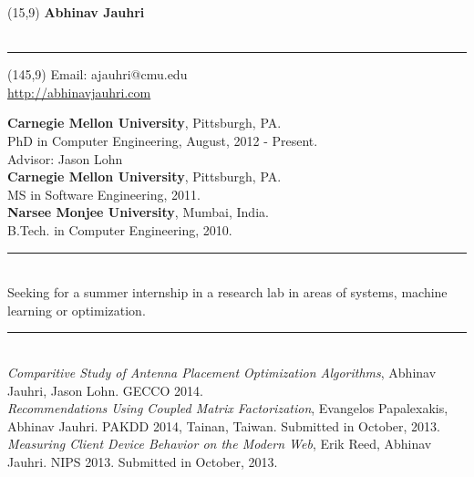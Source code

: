 \documentclass[a4paper,oneside,english]{article}
\begin{document}

\begin{textblock}{50}(15,9)
	\noindent \textbf{\huge Abhinav Jauhri}  \\ \\
        \rule{7in}{0.4pt}
\end{textblock}

\begin{textblock}{50}(145,9)
	\noindent Email: ajauhri@cmu.edu  \\
	\noindent \url{http://abhinavjauhri.com} \\
\end{textblock}

\reversemarginpar
{} 
\noindent \textbf{Carnegie Mellon University}, Pittsburgh, PA.  \\ PhD in Computer Engineering, August, 2012 - Present. \\ Advisor: Jason Lohn  \vspace*{2mm} \\
\textbf{Carnegie Mellon University}, Pittsburgh, PA. \\ MS in Software Engineering, 2011. \vspace*{2mm} \\
\textbf{Narsee Monjee University}, Mumbai, India. \\ B.Tech. in Computer Engineering, 2010. \\
\noindent\rule{6in}{0.4pt}  \\[4pt]
\noindent Seeking for a summer internship in a research lab in areas of systems, machine learning or optimization. \\
\noindent\rule{6in}{0.4pt} \\[4pt]
\textit{Comparitive Study of Antenna Placement Optimization Algorithms}, Abhinav Jauhri, Jason Lohn. GECCO 2014. \vspace*{2mm} \\
\textit{Recommendations Using Coupled Matrix Factorization}, Evangelos Papalexakis, Abhinav Jauhri. PAKDD 2014, Tainan, Taiwan. Submitted in October, 2013. \vspace*{2mm} \\
\textit{Measuring Client Device Behavior on the Modern Web}, Erik Reed, Abhinav Jauhri. NIPS 2013. Submitted in October, 2013. \\
\end{document}
